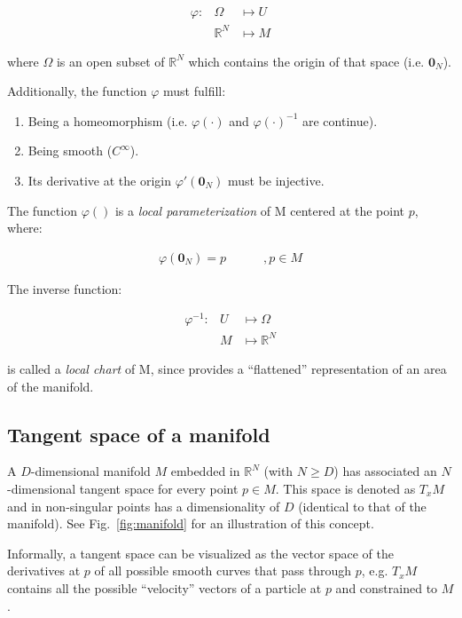 \documentclass[a4paper,11pt]{report}
\begin{document}
\begin{eqnarray}
 \varphi: & \Omega & \mapsto U \\
              & \mathbb{R}^N &  \mapsto M
\end{eqnarray}

\noindent where $\Omega$ is an open subset of $\mathbb{R}^N$
which contains the origin of that space (i.e. $\mathbf{0}_N$). 

Additionally, the function $\varphi$ must fulfill:
\begin{enumerate}
 \item Being a homeomorphism (i.e. $\varphi(\cdot)$ and $\varphi(\cdot)^{-1}$ are continue).
 \item Being smooth ($C^{\infty}$).
 \item Its derivative at the origin $\varphi'(\mathbf{0}_N)$ must be injective.
\end{enumerate}

The function $\varphi()$ is a \emph{local parameterization} of M 
centered at the point $p$, where:

\begin{eqnarray}
 \varphi(\mathbf{0}_N) = p \quad  \quad  \quad  , p \in M
\end{eqnarray}

The inverse function:

\begin{eqnarray}
 \varphi^{-1}: & U & \mapsto \Omega  \\
              & M  &  \mapsto \mathbb{R}^N
\end{eqnarray}

\noindent is called a \emph{local chart} of M, since provides a ``flattened'' 
representation of an area of the manifold.



\subsection{Tangent space of a manifold}
\label{sect:tang_space}

A $D$-dimensional manifold $M$ embedded in $\mathbb{R}^N$ 
(with $N \geq D$) has associated an $N$-dimensional tangent space 
for every point $p \in M$. 
This space is denoted as $T_x M$ and in non-singular points 
has a dimensionality of $D$ (identical to that of the manifold).
See Fig.~\ref{fig:manifold} for an illustration of this concept.

Informally, a tangent space can be visualized as the vector space
of the derivatives at $p$ of all possible smooth curves that pass 
through $p$, e.g. $T_x M$ contains all the possible 
``velocity'' vectors of a particle at $p$ and constrained to $M$.
\end{document}
